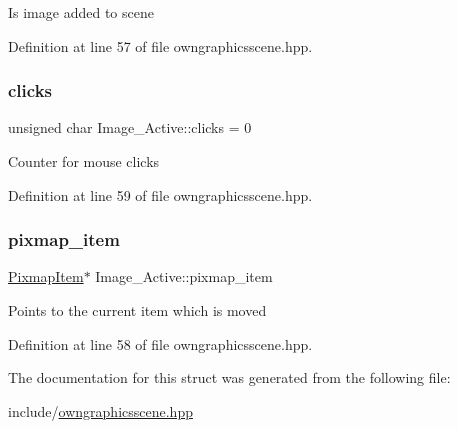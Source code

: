 Is image added to scene 

Definition at line 57 of file owngraphicsscene.\+hpp.

\mbox{\label{structImage__Active_abb039226daf0372a8d88c842f5eb140f}} 
\subsubsection{\texorpdfstring{clicks}{clicks}}
{\footnotesize\ttfamily unsigned char Image\+\_\+\+Active\+::clicks = 0}

Counter for mouse clicks 

Definition at line 59 of file owngraphicsscene.\+hpp.

\mbox{\label{structImage__Active_aa007ea3c9ba4830bbc2706af51820c20}} 
\subsubsection{\texorpdfstring{pixmap\+\_\+item}{pixmap\_item}}
{\footnotesize\ttfamily \mbox{\hyperlink{classPixmapItem}{Pixmap\+Item}}$\ast$ Image\+\_\+\+Active\+::pixmap\+\_\+item}

Points to the current item which is moved 

Definition at line 58 of file owngraphicsscene.\+hpp.



The documentation for this struct was generated from the following file\+:\begin{DoxyCompactItemize}
\item 
include/\mbox{\hyperlink{owngraphicsscene_8hpp}{owngraphicsscene.\+hpp}}\end{DoxyCompactItemize}

